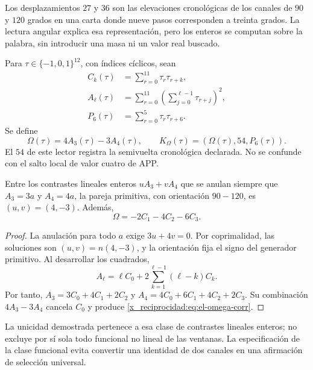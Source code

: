 Los desplazamientos \(27\) y \(36\) son las elevaciones
cronológicas de los canales de \(90\) y \(120\) grados en una carta
donde nueve pasos corresponden a treinta grados. La lectura angular
explica esa representación, pero los enteros se computan sobre la
palabra, sin introducir una masa ni un valor real buscado.

\begin{definition}
Para \(\tau\in\{-1,0,1\}^{12}\), con índices cíclicos, sean
\begin{align*}
 C_k(\tau)&=\sum_{r=0}^{11}\tau_r\tau_{r+k},\\
 A_\ell(\tau)&=\sum_{r=0}^{11}
           \left(\sum_{j=0}^{\ell-1}\tau_{r+j}\right)^2,\\
 P_6(\tau)&=\sum_{r=0}^{5}\tau_r\tau_{r+6}.
\end{align*}
Se define
\begin{equation}
 \Omega(\tau)=4A_3(\tau)-3A_4(\tau),\qquad
 K_\Omega(\tau)=(\Omega(\tau),54,P_6(\tau)).
 \label{x_reciprocidad:eq:el-komega}
\end{equation}
El \(54\) de este lector registra la semivuelta cronológica declarada.
No se confunde con el salto local de valor cuatro de APP.
\end{definition}

\begin{lemma}
Entre los contrastes lineales enteros \(uA_3+vA_4\) que se anulan
siempre que \(A_3=3a\) y \(A_4=4a\), la pareja primitiva, con
orientación \(90-120\), es \((u,v)=(4,-3)\). Además,
\begin{equation}
 \Omega=-2C_1-4C_2-6C_3.
 \label{x_reciprocidad:eq:el-omega-corr}
\end{equation}
\end{lemma}
\begin{proof}
La anulación para todo \(a\) exige \(3u+4v=0\). Por coprimalidad,
las soluciones son \((u,v)=n(4,-3)\), y la orientación fija el signo
del generador primitivo. Al desarrollar los cuadrados,
\[
 A_\ell=\ell C_0+2\sum_{k=1}^{\ell-1}(\ell-k)C_k.
\]
Por tanto,
\(A_3=3C_0+4C_1+2C_2\) y
\(A_4=4C_0+6C_1+4C_2+2C_3\). Su combinación \(4A_3-3A_4\)
cancela \(C_0\) y produce \eqref{x_reciprocidad:eq:el-omega-corr}.
\end{proof}

La unicidad demostrada pertenece a esa clase de contrastes lineales
enteros; no excluye por sí sola todo funcional no lineal de las ventanas.
La especificación de la clase funcional evita convertir una identidad
de dos canales en una afirmación de selección universal.

